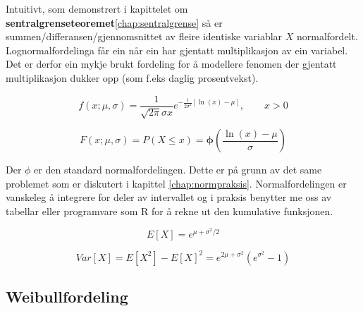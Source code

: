 Intuitivt, som demonstrert i kapittelet om \textbf{sentralgrenseteoremet}\ref{chap:sentralgrense} så er  summen/differansen/gjennomsnittet av fleire identiske variablar $X$ normalfordelt. Lognormalfordelinga får ein når ein har gjentatt multiplikasjon av ein variabel. Det er derfor ein mykje brukt fordeling for å modellere fenomen der gjentatt multiplikasjon dukker opp (som f.eks daglig prosentvekst).

\begin{equation}
    f(x; \mu, \sigma) = \frac{1}{\sqrt{2\pi}\sigma x}e^{-\frac{1}{2\sigma^2}[ \ln(x) - \mu]}, \qquad x > 0
\end{equation}

\begin{equation}
    F(x; \mu, \sigma) = P(X \leq x) = \boldsymbol{\phi}\left(\frac{\ln(x) - \mu}{\sigma}\right)
\end{equation}

Der $\phi$ er den standard normalfordelingen. Dette er på grunn av det same problemet som er diskutert i kapittel \ref{chap:normpraksis}. Normalfordelingen er vanskeleg å integrere for deler av intervallet og i praksis benytter me oss av tabellar eller programvare som R for å rekne ut den kumulative funksjonen.

\begin{equation}
    E[X] = e^{\mu + \sigma^2/2}
\end{equation}

\begin{equation}
    Var[X] = E[X^2] - E[X]^2 = e^{2\mu + \sigma^2}(e^{\sigma^2} - 1)
\end{equation}

\subsection{Weibullfordeling}

